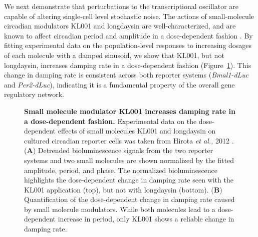 \documentclass[11pt, letterpaper]{article}
\begin{document}

We next demonstrate that perturbations to the transcriptional oscillator are capable of altering single-cell level stochastic noise.
The actions of small-molecule circadian modulators KL001 and longdaysin are well-characterized, and are known to affect circadian period and amplitude in a dose-dependent fashion \cite{St.John2014}.
By fitting experimental data on the population-level responses to increasing dosages of each molecule with a damped sinusoid, we show that KL001, but not longdaysin, increases damping rate in a dose-dependent fashion (Figure~\ref{fig:dose_dependence}).
This change in damping rate is consistent across both reporter systems ({\itshape Bmal1-dLuc} and {\itshape Per2-dLuc}), indicating it is a fundamental property of the overall gene regulatory network.

\begin{figure}[tbp]
  \begin{center}
  \end{center}
  \caption{{\bfseries Small molecule modulator KL001 increases damping rate in a dose-dependent fashion.}
  Experimental data on the dose-dependent effects of small molecules KL001 and longdaysin on cultured circadian reporter cells was taken from Hirota {\itshape et al.,} 2012 \cite{Hirota2012}.
({\bfseries A}) Detrended bioluminescence signals from the two reporter systems and two small molecules are shown normalized by the fitted amplitude, period, and phase. The normalized bioluminescence highlights the dose-dependent change in damping rate seen with the KL001 application (top), but not with longdaysin (bottom).
({\bfseries B}) Quantification of the dose-dependent change in damping rate caused by small molecule modulators. While both molecules lead to a dose-dependent increase in period, only KL001 shows a reliable change in damping rate.}
\label{fig:dose_dependence}
\end{figure}
\end{document}
